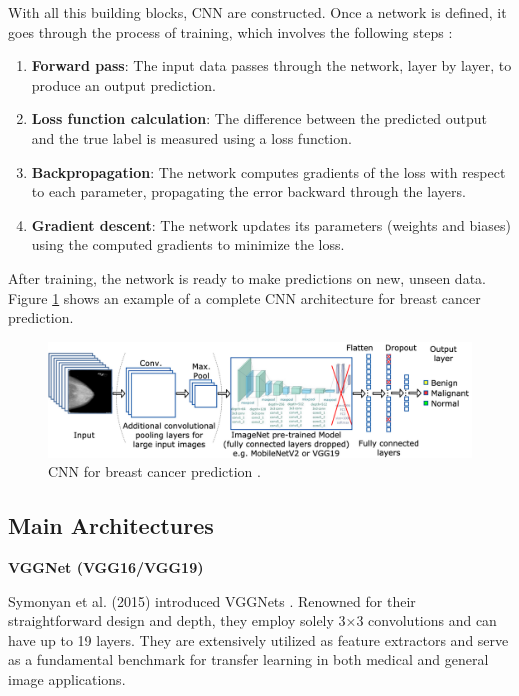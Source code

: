 \documentclass[a4paper,10pt]{book}
\begin{document}
With all this building blocks, CNN are constructed. Once a network is defined, it goes through the process of training, which involves the following steps \cite{bergmann_what_2024}:

\begin{enumerate}
    \item \textbf{Forward pass}: The input data passes through the network, layer by layer, to produce an output prediction.
    \item \textbf{Loss function calculation}: The difference between the predicted output and the true label is measured using a loss function.
    \item  \textbf{Backpropagation}: The network computes gradients of the loss with respect to each parameter, propagating the error backward through the layers.
    \item \textbf{Gradient descent}: The network updates its parameters (weights and biases) using the computed gradients to minimize the loss.
\end{enumerate}

After training, the network is ready to make predictions on new, unseen data. Figure \ref{fig:cnn_breast} shows an example of a complete CNN architecture for breast cancer prediction.

\begin{figure}[h!]
    \centering
    \includegraphics[width=0.75\linewidth]{reports//assets/cnn_breast.png}
    \caption[Breast cancer CNN]{CNN for breast cancer prediction \cite{jaamour_divide_2023}.}
    \label{fig:cnn_breast}
\end{figure}

\subsection{Main Architectures}

\textbf{VGGNet (VGG16/VGG19)}

Symonyan et al. (2015) introduced VGGNets \cite{simonyanVeryDeepConvolutional}. Renowned for their straightforward design and depth, they employ solely 3×3 convolutions and can have up to 19 layers. They are extensively utilized as feature extractors and serve as a fundamental benchmark for transfer learning in both medical and general image applications.
\end{document}
